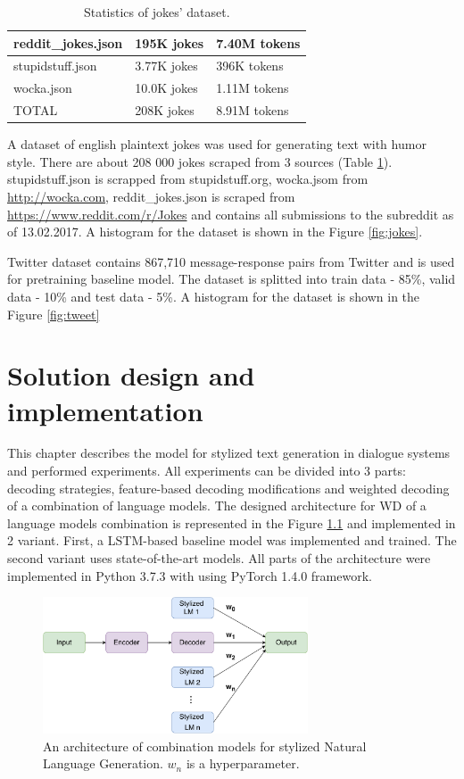 \begin{table}[ht]
\centering
 \begin{tabular}{|p{4cm}|p{3cm}|p{3cm}|} 
 \hline\hline
 reddit\_jokes.json & 195K jokes & 7.40M tokens \\
 \hline
 stupidstuff.json & 3.77K jokes & 396K tokens \\
 \hline
 wocka.json & 10.0K jokes & 1.11M tokens \\
 \hline\hline
 TOTAL & 208K jokes & 8.91M tokens \\
 \hline\hline
 \end{tabular}
 \caption{Statistics of jokes' dataset.}
\label{tab:jokes}
\end{table}


A dataset of english plaintext jokes was used for generating text with humor style. There are about 208 000 jokes scraped from 3 sources (Table \ref{tab:jokes}). stupidstuff.json is scrapped from stupidstuff.org, wocka.jsom from \url{http://wocka.com}, reddit\_jokes.json is scraped from \url{https://www.reddit.com/r/Jokes} and contains all submissions to the subreddit as of 13.02.2017. A histogram for the dataset is shown in the Figure \ref{fig:jokes}.

Twitter dataset contains 867,710 message-response pairs from Twitter and is used for pretraining baseline model. The dataset is splitted into train data - 85\%, valid data - 10\% and test data - 5\%. A histogram for the dataset is shown in the Figure \ref{fig:tweet}


\chapter{Solution design and implementation} \label{solution_design}
This chapter describes the model for stylized text generation in dialogue systems and performed experiments. All experiments can be divided into 3 parts: decoding strategies, feature-based decoding modifications and weighted decoding of a combination of language models. The designed architecture for WD of a language models combination is represented in the Figure \ref{architecture_nlg} and implemented in 2 variant. First, a LSTM-based baseline model was implemented and trained. The second variant uses state-of-the-art models. All parts of the architecture were implemented in Python 3.7.3 with using PyTorch 1.4.0 framework.

\begin{figure}[hbt]
  \centering
  \includegraphics[width=0.7\textwidth]{figures/model.pdf}
  \caption{An architecture of combination models for stylized Natural Language Generation. $w_n$ is a hyperparameter.}
  \label{architecture_nlg}
\end{figure}

